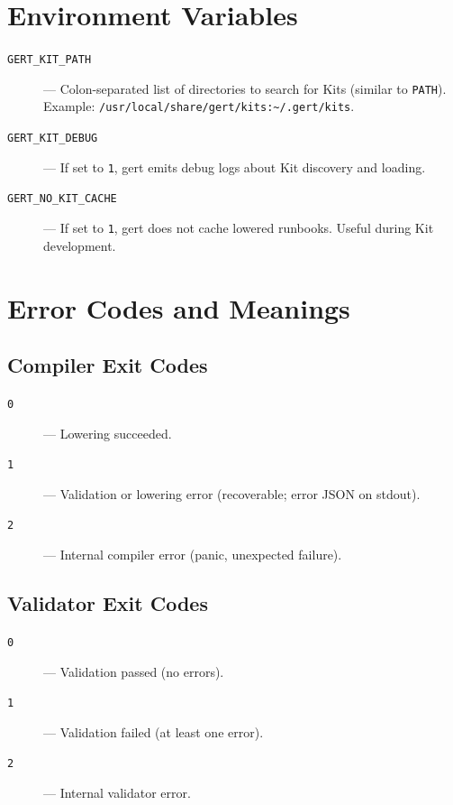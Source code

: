 \section{Environment Variables}
\label{sec:env-vars}

\begin{description}
  \item[\texttt{GERT\_KIT\_PATH}] --- Colon-separated list of directories to
    search for Kits (similar to \texttt{PATH}). Example:
    \texttt{/usr/local/share/gert/kits:\textasciitilde/.gert/kits}.

  \item[\texttt{GERT\_KIT\_DEBUG}] --- If set to \texttt{1}, gert emits debug
    logs about Kit discovery and loading.

  \item[\texttt{GERT\_NO\_KIT\_CACHE}] --- If set to \texttt{1}, gert does not
    cache lowered runbooks. Useful during Kit development.
\end{description}

\section{Error Codes and Meanings}
\label{sec:error-codes}

\subsection{Compiler Exit Codes}

\begin{description}
  \item[\texttt{0}] --- Lowering succeeded.
  \item[\texttt{1}] --- Validation or lowering error (recoverable; error JSON
    on stdout).
  \item[\texttt{2}] --- Internal compiler error (panic, unexpected failure).
\end{description}

\subsection{Validator Exit Codes}

\begin{description}
  \item[\texttt{0}] --- Validation passed (no errors).
  \item[\texttt{1}] --- Validation failed (at least one error).
  \item[\texttt{2}] --- Internal validator error.
\end{description}


